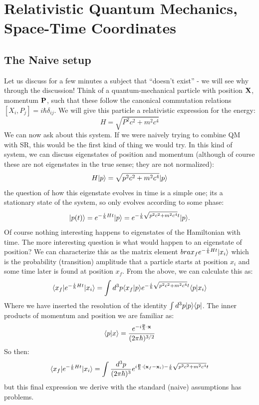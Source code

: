 \section{Relativistic Quantum Mechanics, Space-Time Coordinates}
\subsection{The Naive setup}
Let us discuss for a few minutes a subject that ``doesn't exist'' - we will see why through the discussion! Think of a quantum-mechanical particle with position $\mathbf{X}$, momentum $\mathbf{P}$, such that these follow the canonical commutation relations $[X_i, P_j] = i\hbar \delta_{ij}$. We will give this particle a relativistic expression for the energy:
\begin{equation}
    H = \sqrt{P^2c^2 + m^2c^4}
\end{equation}
We can now ask about this system. If we were naively trying to combine QM with SR, this would be the first kind of thing we would try. In this kind of system, we can discuss eigenstates of position and momentum (although of course these are not eigenstates in the true sense; they are not normalized):
\begin{equation}
    H\lvert p \rangle = \sqrt{p^2c^2 + m^2c^4}\lvert p \rangle
\end{equation}
the question of how this eigenstate evolves in time is a simple one; its a stationary state of the system, so only evolves according to some phase:
\begin{equation}
    \lvert p(t) \rangle = e^{-\frac{i}{\hbar}Ht}\lvert p \rangle = e^{-\frac{i}{\hbar}\sqrt{p^2c^2 + m^2c^4}t}\lvert p \rangle.
\end{equation}
Of course nothing interesting happens to eigenstates of the Hamiltonian with time. The more interesting question is what would happen to an eigenstate of position? We can characterize this as the matrix element $bra{x_f}e^{-\frac{i}{\hbar}Ht}\lvert x_i \rangle$ which is the probability (transition) amplitude that a particle starts at position $x_i$ and some time later is found at position $x_f$. From the above, we can calculate this as:
\begin{equation}
    \langle x_f \rvert e^{-\frac{i}{\hbar}Ht}\lvert x_i \rangle = \int d^3p \langle x_f \lvert p \rangle e^{-\frac{i}{\hbar}\sqrt{p^2c^2 + m^2c^4}t}\langle p \lvert x_i \rangle
\end{equation}
Where we have inserted the resolution of the identity $\int d^3p \lvert p \rangle \langle p \rvert$. The inner products of momentum and position we are familiar as:
\begin{equation}
    \langle p \lvert x \rangle = \frac{e^{-i\frac{\mathbf{p}}{\hbar}\cdot\mathbf{x}}}{(2\pi\hbar)^{3/2}}
\end{equation}
So then:
\begin{equation}
    \langle x_f \rvert e^{-\frac{i}{\hbar}Ht}\lvert x_i \rangle = \int \frac{d^3p}{(2\pi\hbar)^3}e^{i\frac{\mathbf{p}}{\hbar}\cdot(\mathbf{x}_f - \mathbf{x}_i) -\frac{i}{\hbar}\sqrt{p^2c^2 + m^2c^4}t}
\end{equation}
but this final expression we derive with the standard (naive) assumptions has problems. 

